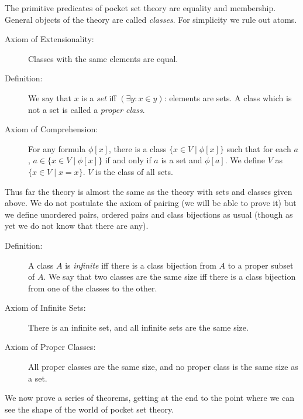 \documentclass[12pt]{book}
\begin{document}
The primitive predicates of pocket set theory are equality and membership. General objects of the theory are called {\em classes\/}.  For simplicity we rule out atoms.

\begin{description}

\item[Axiom of Extensionality:]    Classes with the same elements are equal.

\item[Definition:]  We say that $x$ is a {\em set\/} iff $(\exists y:x \in y)$:  elements are sets.  A class which is not a set is called a {\em proper class\/}.

\item[Axiom of Comprehension:]  For any formula $\phi[x]$, there is a class $\{x \in V\mid \phi[x]\}$ such that for each $a$,
$a \in \{x \in V\mid \phi[x]\}$ if and only if $a$ is a set and $\phi[a]$.  We define $V$ as $\{x \in V\mid x=x\}$.  $V$ is the class of all sets.

\end{description}

Thus far the theory is almost the same as the theory with sets and classes given above.  We do not postulate the axiom of pairing (we will be able to prove it) but we define unordered pairs, ordered pairs and class bijections as usual (though as yet we do not know that there are any).

\begin{description}

\item[Definition:]  A class $A$ is {\em infinite\/} iff there is a class bijection from $A$ to a proper subset of $A$.  We say that two classes
are the same size iff there is a class bijection from one of the classes to the other.

\item[Axiom of Infinite Sets:]  There is an infinite set, and all infinite sets are the same size.

\item[Axiom of Proper Classes:]  All proper classes are the same size, and no proper class is the same size as a set.

\end{description}

We now prove a series of theorems, getting at the end to the point where we can see the shape of the world of pocket set theory.
\end{document}

